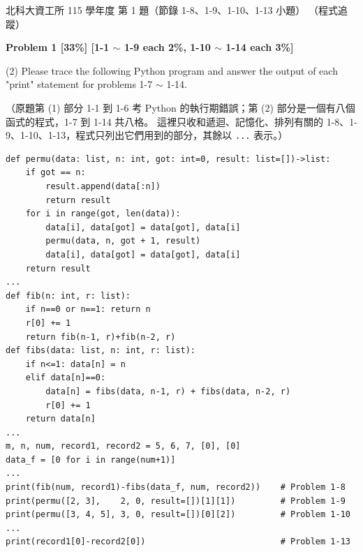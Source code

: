 \begin{pastexam}[label={px:ntut-115-prog-01}]{北科大資工所 115 學年度 第 1 題（節錄 1-8、1-9、1-10、1-13 小題）}
（程式追蹤）

\textbf{Problem 1 [33\%] [1-1 $\sim$ 1-9 each 2\%, 1-10 $\sim$ 1-14 each 3\%]}

(2) Please trace the following Python program and answer the output of each "print" statement for problems 1-7 $\sim$ 1-14.

（原題第 (1) 部分 1-1 到 1-6 考 Python 的執行期錯誤；第 (2) 部分是一個有八個函式的程式，1-7 到 1-14 共八格。
這裡只收和遞迴、記憶化、排列有關的 1-8、1-9、1-10、1-13，程式只列出它們用到的部分，其餘以
\texttt{...} 表示。）
\begin{verbatim}
def permu(data: list, n: int, got: int=0, result: list=[])->list:
    if got == n:
        result.append(data[:n])
        return result
    for i in range(got, len(data)):
        data[i], data[got] = data[got], data[i]
        permu(data, n, got + 1, result)
        data[i], data[got] = data[got], data[i]
    return result
...
def fib(n: int, r: list):
    if n==0 or n==1: return n
    r[0] += 1
    return fib(n-1, r)+fib(n-2, r)
def fibs(data: list, n: int, r: list):
    if n<=1: data[n] = n
    elif data[n]==0:
        data[n] = fibs(data, n-1, r) + fibs(data, n-2, r)
        r[0] += 1
    return data[n]
...
m, n, num, record1, record2 = 5, 6, 7, [0], [0]
data_f = [0 for i in range(num+1)]
...
print(fib(num, record1)-fibs(data_f, num, record2))    # Problem 1-8
print(permu([2, 3],    2, 0, result=[])[1][1])         # Problem 1-9
print(permu([3, 4, 5], 3, 0, result=[])[0][2])         # Problem 1-10
...
print(record1[0]-record2[0])                           # Problem 1-13
\end{verbatim}
\end{pastexam}

